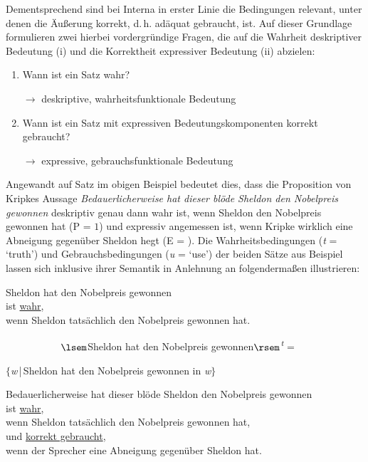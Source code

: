 \noindent Dementsprechend sind bei Interna in erster Linie die Bedingungen relevant, unter denen die Äußerung korrekt, d.\,h. adäquat gebraucht, ist. Auf dieser Grundlage formulieren \citet[7]{dAvis.2019b} zwei hierbei vordergründige Fragen, die auf die Wahrheit deskriptiver Bedeutung (i) und die Korrektheit expressiver Bedeutung (ii) abzielen:

\renewcommand{\labelenumi}{\roman{enumi}.}
\begin{enumerate}
\item Wann ist ein Satz wahr? \par $\rightarrow$ deskriptive, wahrheitsfunktionale Bedeutung
\item Wann ist ein Satz mit expressiven Bedeutungskomponenten korrekt gebraucht? \par $\rightarrow$ expressive, gebrauchsfunktionale Bedeutung
\end{enumerate}

\noindent Angewandt auf Satz  im obigen Beispiel bedeutet dies, dass die Proposition von Kripkes Aussage \textit{{Bedauerlicherweise} hat dieser {blöde} Sheldon den Nobelpreis gewonnen} deskriptiv genau dann wahr ist, wenn Sheldon den Nobelpreis gewonnen hat (P = $1$) und expressiv angemessen ist, wenn Kripke wirklich eine Abneigung gegenüber Sheldon hegt {(E = )}. Die {Wahrheitsbedingungen (\textit{t} = `truth')} und {Gebrauchsbedingungen (\textit{u} = `use')} der beiden Sätze aus Beispiel  lassen sich inklusive ihrer Semantik in Anlehnung an {\citet[20f.]{Gutzmann.2015a}} folgendermaßen illustrieren:

\ea
\glqq{}Sheldon hat den Nobelpreis gewonnen\grqq{}\\
ist \uline{wahr},\\
wenn Sheldon tatsächlich den Nobelpreis gewonnen hat. 

\ \ \ \ \ \ \ \ \ \ \ $\lsem$Sheldon hat den Nobelpreis gewonnen$\rsem$\textsuperscript{\textit{t}} =

 \hfill $\lbrace${\textit{w}\,|\,Sheldon hat den Nobelpreis gewonnen in \textit{w}}$\rbrace$
\z

\ea
\glqq{}Bedauerlicherweise hat dieser blöde Sheldon den Nobelpreis gewonnen\grqq{} \\
ist \uline{wahr},\\
wenn Sheldon tatsächlich den Nobelpreis gewonnen hat, \\
und \uline{korrekt gebraucht},\\
wenn der Sprecher eine Abneigung gegenüber Sheldon hat. 
 
